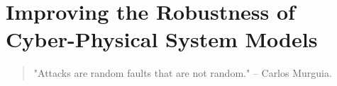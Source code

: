 \chapter{Improving the Robustness of Cyber-Physical System Models}
\label{ch:CPSRobustness}
\begin{quote}
    "Attacks are random faults that are not random." -- Carlos Murguia.  
\end{quote}
